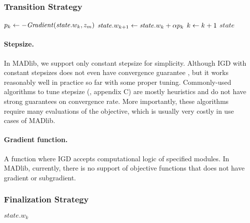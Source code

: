 \subsubsection{Transition Strategy}
\begin{algorithm} \label{alg:transition-igd}
\begin{algorithmic}[1]
    \State $p_k \leftarrow - \mathit{Gradient}(\mathit{state}.w_k, z_m)$
    \State $\mathit{state}.w_{k+1} \leftarrow \mathit{state}.w_k + \alpha p_k$
    \State $k \leftarrow k + 1$
    \State \Return $\mathit{state}$
\end{algorithmic}
\end{algorithm}

\paragraph{Stepsize.}
In MADlib, we support only constant stepsize for simplicity.
Although IGD with constant stepsizes does not even have convergence guarantee \cite{springerlink:10.1007/s10107-011-0472-0}, but it works reasonably well in practice so far \cite{DBLP:conf/sigmod/FengKRR12} with some proper tuning.
Commonly-used algorithms to tune stepsize (\cite{bertsekas1999nonlinear}, appendix C) are mostly heuristics and do not have strong guarantees on convergence rate.
More importantly, these algorithms require many evaluations of the objective, which is usually very costly in use cases of MADlib.

\paragraph{Gradient function.}
A function where IGD accepts computational logic of specified modules.
In MADlib, currently, there is no support of objective functions that does not have gradient or subgradient.

\subsubsection{Finalization Strategy}
\begin{algorithm} \label{alg:finalization-igd}
\begin{algorithmic}[1]
    \State \Return $\mathit{state}.w_k$
\end{algorithmic}
\end{algorithm}

